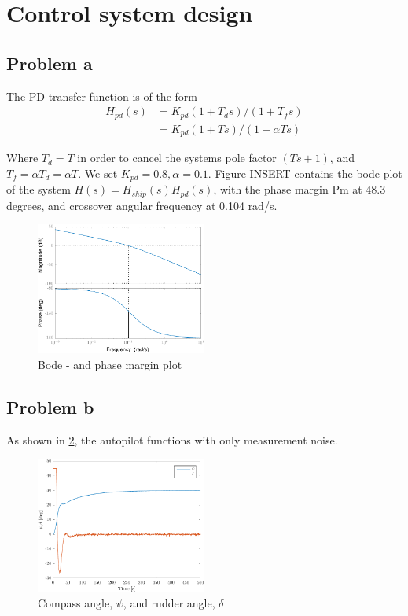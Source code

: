 \section{Control system design}

\subsection{Problem a}

The PD transfer function is of the form
\begin{align*}
    H_{pd}(s) &= K_{pd}(1+T_d s)/(1+T_f s) \\
              &= K_{pd}(1+T s)/(1+\alpha T s)
\end{align*}

Where $T_d = T$ in order to cancel the systems pole factor $(Ts + 1)$, and $T_f = \alpha T_d = \alpha T$. We set $K_{pd} = 0.8, \alpha = 0.1$. Figure INSERT contains the bode plot of the system $H(s) = H_{ship}(s)H_{pd}(s)$, with the phase margin Pm at 48.3 degrees, and crossover angular frequency at 0.104 rad/s.

\begin{figure}[ht]
    \centering
    \includegraphics[width=0.5\textwidth]{images/3a-bode_and_phasemargin}
    \caption{Bode - and phase margin plot}
    \label{fig:3a-bode_and_phasemargin}
\end{figure}

\subsection{Problem b}
As shown in \cref{fig:3b-psi_and_rudder}, the autopilot functions with only measurement noise.

\begin{figure}[ht]
    \centering
    \includegraphics[width=0.5\textwidth]{images/3b-psi_and_rudder}
    \caption{Compass angle, $\psi$, and rudder angle, $\delta$}
    \label{fig:3b-psi_and_rudder}
\end{figure}

